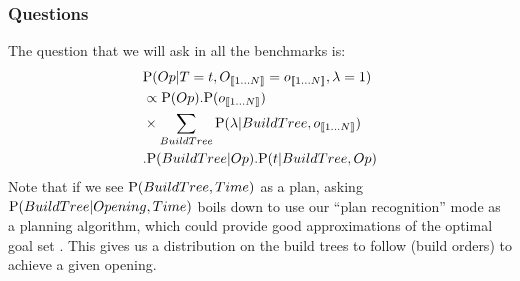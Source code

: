 \subsubsection{Questions}
The question that we will ask in all the benchmarks is:
\begin{eqnarray*}
 & \mathrm{P}(Op|T=t, O_{\llbracket 1\dots N\rrbracket}=o_{\llbracket 1\dots N\rrbracket}, \lambda = 1) \\
 & \propto \mathrm{P}(Op).\mathrm{P}(o_{\llbracket 1\dots N\rrbracket})\\
 & \times \sum_{BuildTree} \mathrm{P}(\lambda | BuildTree, o_{\llbracket 1\dots N\rrbracket})\\
 & .\mathrm{P}(BuildTree|Op).\mathrm{P}(t|BuildTree, Op)
\end{eqnarray*}
Note that if we see $\mathrm{P}(BuildTree, Time)$ as a plan, asking $\mathrm{P}(BuildTree|Opening, Time)$ boils down to use our ``plan recognition'' mode as a planning algorithm, which could provide good approximations of the optimal goal set \citep{Ramirez}. This gives us a distribution on the build trees to follow (build orders) to achieve a given opening.


